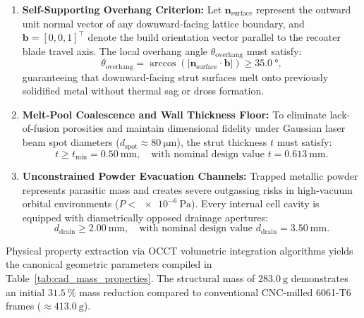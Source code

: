 \begin{enumerate}
\item \textbf{Self-Supporting Overhang Criterion:}
Let $\mathbf{n}_{\text{surface}}$ represent the outward unit normal vector of any downward-facing lattice boundary, and $\mathbf{b} = [0, 0, 1]^\top$ denote the build orientation vector parallel to the recoater blade travel axis. The local overhang angle $\theta_{\text{overhang}}$ must satisfy:
\begin{equation}
\theta_{\text{overhang}} = \arccos(|\mathbf{n}_{\text{surface}} \cdot \mathbf{b}|) \ge \SI{35.0}{\degree},
\label{eq:dfam_overhang}
\end{equation}
guaranteeing that downward-facing strut surfaces melt onto previously solidified metal without thermal sag or dross formation.
\item \textbf{Melt-Pool Coalescence and Wall Thickness Floor:}
To eliminate lack-of-fusion porosities and maintain dimensional fidelity under Gaussian laser beam spot diameters ($d_{\text{spot}} \approx \SI{80}{\micro\meter}$), the strut thickness $t$ must satisfy:
\begin{equation}
t \ge t_{\min} = \SI{0.50}{\milli\meter}, \quad \text{with nominal design value } t = \SI{0.613}{\milli\meter}.
\label{eq:dfam_thickness}
\end{equation}
\item \textbf{Unconstrained Powder Evacuation Channels:}
Trapped metallic powder represents parasitic mass and creates severe outgassing risks in high-vacuum orbital environments ($P < \SI{e-6}{\pascal}$). Every internal cell cavity is equipped with diametrically opposed drainage apertures:
\begin{equation}
d_{\text{drain}} \ge \SI{2.00}{\milli\meter}, \quad \text{with nominal design value } d_{\text{drain}} = \SI{3.50}{\milli\meter}.
\label{eq:dfam_drain}
\end{equation}
\end{enumerate}

Physical property extraction via OCCT volumetric integration algorithms yields the canonical geometric parameters compiled in Table~\ref{tab:cad_mass_properties}. The structural mass of $\SI{283.0}{\gram}$ demonstrates an initial $\SI{31.5}{\percent}$ mass reduction compared to conventional CNC-milled 6061-T6 frames ($\approx \SI{413.0}{\gram}$).

